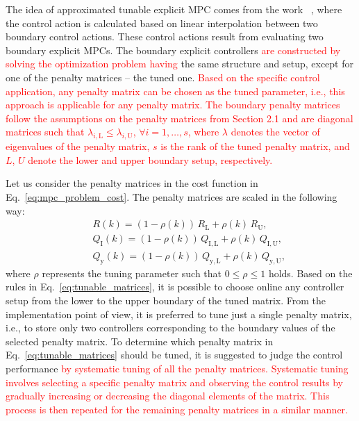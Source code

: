 \documentclass[preprint,12pt]{elsarticle}
\newcommand{\change}[1]{\textcolor{red}{#1}}
\begin{document}
	The idea of approximated tunable explicit MPC comes from the work ~\cite{Klauco_tunable}, where the control action is calculated based on linear interpolation between two boundary control actions. These control actions result from evaluating two boundary explicit MPCs. The boundary explicit controllers \change{are constructed by solving the optimization problem having} the same structure and setup, except for one of the penalty matrices -- the tuned one. \change{Based on the specific control application, any penalty matrix can be chosen as the tuned parameter, i.e., this approach is applicable for any penalty matrix. The boundary penalty matrices follow the assumptions on the penalty matrices from Section 2.1 and are diagonal matrices such that $\lambda_{i,\mathrm{L}} \le \lambda_{i,\mathrm{U}}$, $\forall i = 1,\dots,s$, where $\lambda$ denotes the vector of eigenvalues of the penalty matrix, $s$ is the rank of the tuned penalty matrix, and $L$, $U$ denote the lower and upper boundary setup, respectively. }
	
	Let us consider the penalty matrices in the cost function in Eq.~\eqref{eq:mpc_problem_cost}. The penalty matrices are scaled in the following way:
	\begin{subequations}
		\label{eq:tunable_matrices}
		\begin{eqnarray}
			\label{eq:tunable_R}
			&~& R(k) = (1-\rho(k)) \, R_\mathrm{L} + \rho(k) \, R_\mathrm{U}, \\
			\label{eq:tunable_Qx}
			&~& Q_\mathrm{I}(k) = (1-\rho(k)) \, Q_\mathrm{I,L} + \rho(k) \, Q_\mathrm{I,U}, \\
			\label{eq:tunable_Qy}
			&~& Q_\mathrm{y}(k) = (1-\rho(k)) \, Q_\mathrm{y,L} + \rho(k) \, Q_\mathrm{y,U},
		\end{eqnarray}
	\end{subequations}
	where $\rho$ represents the tuning parameter such that $0 \le \rho \le 1$ holds. Based on the rules in Eq.~\eqref{eq:tunable_matrices}, it is possible to choose online any controller setup from the lower to the upper boundary of the tuned matrix. From the implementation point of view, it is preferred to tune just a single penalty matrix, i.e., to store only two controllers corresponding to the boundary values of the selected penalty matrix. To determine which penalty matrix in Eq.~\eqref{eq:tunable_matrices} should be tuned, it is suggested to judge the control performance \change{by systematic tuning of all the penalty matrices. Systematic tuning involves selecting a specific penalty matrix and observing the control results by gradually increasing or decreasing the diagonal elements of the matrix. This process is then repeated for the remaining penalty matrices in a similar manner.}
	
\end{document}
